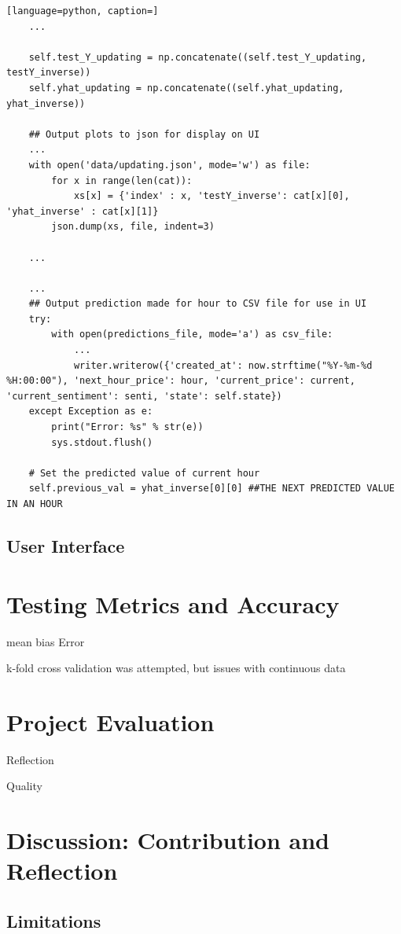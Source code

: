 \documentclass[oneside, 12pt]{article}
\begin{document}
\begin{lstlisting}[language=python, caption=]
	...
	
	self.test_Y_updating = np.concatenate((self.test_Y_updating, testY_inverse))
	self.yhat_updating = np.concatenate((self.yhat_updating, yhat_inverse))
	
	## Output plots to json for display on UI
	...
	with open('data/updating.json', mode='w') as file:
		for x in range(len(cat)):
			xs[x] = {'index' : x, 'testY_inverse': cat[x][0], 'yhat_inverse' : cat[x][1]}
		json.dump(xs, file, indent=3)
	
	...
	
	...
	## Output prediction made for hour to CSV file for use in UI
	try:
		with open(predictions_file, mode='a') as csv_file:
			...
			writer.writerow({'created_at': now.strftime("%Y-%m-%d %H:00:00"), 'next_hour_price': hour, 'current_price': current, 'current_sentiment': senti, 'state': self.state})
	except Exception as e:
		print("Error: %s" % str(e))
		sys.stdout.flush()
	
	# Set the predicted value of current hour
	self.previous_val = yhat_inverse[0][0] ##THE NEXT PREDICTED VALUE IN AN HOUR
		\end{lstlisting}
		
		\subsection{User Interface}
		
	\newpage
	
	\section{Testing Metrics and Accuracy}
	mean bias Error
	
	k-fold cross validation was attempted, but issues with continuous data
	
	\newpage
	
	\section{Project Evaluation}
	Reflection
	
	Quality
	
	
	\section{Discussion: Contribution and Reflection}
	\subsection{Limitations}
	
\end{document}
